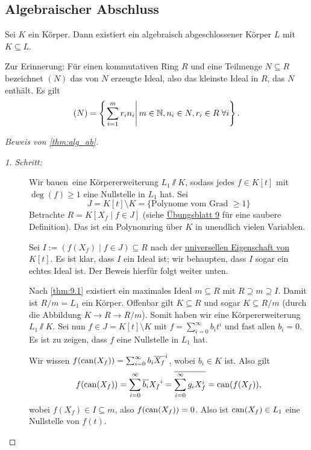 \documentclass[12pt,a4paper]{scrartcl}
\begin{document}
\subsection{Algebraischer Abschluss}
\begin{satz}\label{thm:alg_ab}
	Sei $K$ ein Körper. Dann existiert ein algebraisch abgeschlossener Körper $L$ mit $K\subseteq L$.
\end{satz}

Zur Erinnerung: Für einen kommutativen Ring $R$ und eine Teilmenge $N\subseteq R$ bezeichnet $(N)$ das von $N$ erzeugte Ideal, also das kleinste Ideal in $R$, das $N$ enthält. Es gilt \[(N) = \left\{\left.\sum_{i = 1}^mr_in_i\right|m\in\mathbb N, n_i\in N, r_i\in R \;\forall i\right\}.\]

\begin{proof}[Beweis von \cref{thm:alg_ab}]
	\leavevmode
	\begin{description}
		\item[\emph{1. Schritt:}] Wir \glqq bauen\grqq\ eine Körpererweiterung $L_1\sslash K$, sodass jedes $f\in K[t]$ mit $\deg(f)\geq 1$ eine Nullstelle in $L_1$ hat. Sei 
		\[J = K[t]\setminus K = \{\text{Polynome vom Grad $\geq 1$}\}\]
		Betrachte $R = K[X_f\mid f\in J]$ (siehe \href{http://www.math.uni-bonn.de/people/palmer/EIDA-Blatt-09.pdf}{Übungsblatt 9} für eine saubere Definition).
		Das ist ein Polynomring über $K$ in unendlich vielen Variablen.
		
		Sei $I := (f(X_f)\mid f\in J)\subseteq R$ nach der \hyperref[thm:unieig_polyring]{universellen Eigenschaft von $K[t]$}. Es ist klar, dass $I$ ein Ideal ist; wir behaupten, dass $I$ sogar ein echtes Ideal ist. Der Beweis hierfür folgt weiter unten.
		
		Nach \cref{thm:9.1} existiert ein maximales Ideal $m\subseteq R$ mit $R\supseteq m \supseteq I$. Damit ist $R/m = L_1 $ ein Körper. Offenbar gilt $K \subseteq R$ und sogar $K \subseteq R/m$ (durch die Abbildung $K\to R\to R/m$). Somit haben wir eine Körpererweiterung $L_1\sslash K$. Sei nun $f\in J = K[t]\setminus K$ mit $f = \sum_{i = 0}^{\infty} b_i t^i$ und fast allen $b_i = 0$. Es ist zu zeigen, dass $f$ eine Nullstelle in $L_1$ hat.
		
		Wir wissen $f(\operatorname{can}(X_f)) = \sum_{i = 0}^{\infty}b_i\overline{X_f}^i$, wobei $b_i\in K$ ist. Also gilt \[f(\operatorname{can}(X_f)) = \sum_{i = 0}^{\infty}\overline{b_i}{X_f}^i = \overline{\sum_{i = 0}^{\infty}g_iX_f^i} = \operatorname{can}(f(X_f)),\] wobei $f(X_f)\in I\subseteq m$, also $f(\operatorname{can}(X_f)) = 0$. Also ist $\operatorname{can}(X_f)\in L_1$ eine Nullstelle von $f(t)$.
		

\end{description}
\end{proof}
\end{document}
